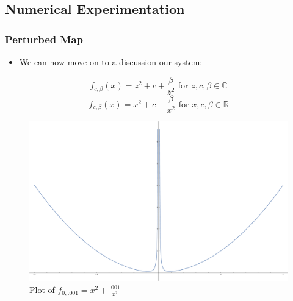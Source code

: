 \documentclass{beamer}
\newcommand{\R}{\mathbb{R}}
\newcommand{\C}{\mathbb{C}}
\newcommand{\<}{\left\langle}
\renewcommand{\>}{\right\rangle} %
\renewcommand{\*}{\cdot} %
\begin{document}
\subsection{Numerical Experimentation}
\begin{frame}
	\frametitle{Perturbed Map}
	\begin{itemize}
		\item We can now move on to a discussion our system:
	\end{itemize}
		{\small\[
			f_{c, \beta} (x) = z^2 + c + \frac{\beta}{\overline{z}^2} \text{ for } z,c, \beta \in \C 
		\]
		\[
			f_{c, \beta} (x) = x^2 + c + \frac{\beta}{x^2} \text{ for } x,c, \beta \in \R 
		\]}
		\begin{figure}
			\includegraphics[height = .5\textheight]{./img/singplot}
			\caption{Plot of $f_{0,.001} = x^2 + \frac{.001}{x^2}$}
		\end{figure}
\end{frame}
\end{document}
